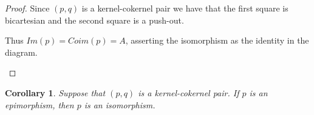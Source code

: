 \documentclass[11pt]{article}
\newtheorem{corollary}{Corollary}[theorem]
\theoremstyle{definition}
\theoremstyle{remark}
\begin{document}
            \begin{proof}
                Since $(p,q)$ is a kernel-cokernel pair we have that the first square is bicartesian and the second square is a push-out.
                \begin{center}
                \end{center}
                Thus $Im(p)=Coim(p)=A$, asserting the isomorphism as the identity in the diagram.
                \begin{center}
                \end{center}
            \end{proof}

            \begin{corollary}
                Suppose that $(p,q)$ is a kernel-cokernel pair. If $p$ is an epimorphism, then $p$ is an isomorphism.
            \end{corollary}
\end{document}
